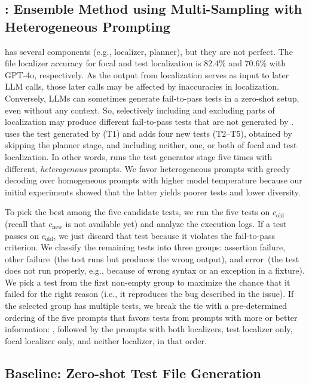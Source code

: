 \subsection{\soly: Ensemble Method using Multi-Sampling with Heterogeneous Prompting}

\solx has several components (e.g., localizer, planner), but they are not
perfect.  The file localizer accuracy for focal and test localization is 82.4\%
and 70.6\% with GPT-4o, respectively.  As the output from localization serves as
input to later LLM calls, those later calls may be affected by inaccuracies in
localization.  Conversely, LLMs can sometimes generate fail-to-pass tests in a
zero-shot setup, even without any context.  So, selectively including and
excluding parts of localization may produce different fail-to-pass tests that
are not generated by \solx.  \soly uses the test generated by \solx (T1) and
adds four new tests (T2--T5), obtained by skipping the planner stage, and
including neither, one, or both of focal and test localization.  In other words,
\soly runs the test generator stage five times with different,
\emph{heterogenous} prompts.  We favor heterogeneous prompts with greedy
decoding over homogeneous prompts with higher model temperature because our
initial experiments showed that the latter yields poorer tests and lower
diversity.

To pick the best among the five candidate tests, we run the five tests on
$c_\textrm{old}$ (recall that $c_\textrm{new}$ is not available yet) and analyze
the execution logs.  If a test passes on $c_\textrm{old}$, we just discard that
test because it violates the fail-to-pass criterion.  We classify the remaining
tests into three groups: assertion failure, other failure~(the test runs but
produces the wrong output), and error~(the test does not run properly, e.g.,
because of wrong syntax or an exception in a fixture).  We pick a test from the
first non-empty group to maximize the chance that it failed for the right reason
(i.e., it reproduces the bug described in the issue).  If the selected group has
multiple tests, we break the tie with a pre-determined ordering of the five
prompts that favors tests from prompts with more or better information: \solx,
followed by the prompts with both localizers, test localizer only, focal
localizer only, and neither localizer, in that order.


\subsection{Baseline: Zero-shot Test File Generation}

